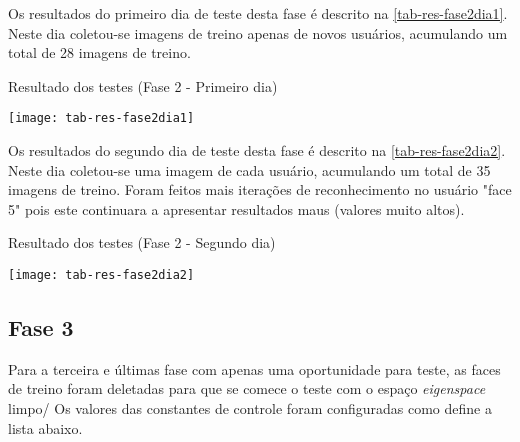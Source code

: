 Os resultados do primeiro dia de teste desta fase é descrito na \autoref{tab-res-fase2dia1}. Neste dia coletou-se imagens de treino apenas de novos usuários, acumulando um total de 28 imagens de treino. 


\begin{table}[h]
	\centering
	\caption{Resultado dos testes (Fase 2 - Primeiro dia) }
	\texttt{[image: tab-res-fase2dia1]}
	\label{tab-res-fase2dia1}
\end{table}


Os resultados do segundo dia de teste desta fase é descrito na \autoref{tab-res-fase2dia2}. Neste dia coletou-se uma imagem de cada usuário, acumulando um total de 35 imagens de treino. Foram feitos mais iterações de reconhecimento no usuário "face 5" pois este continuara a apresentar resultados maus (valores muito altos).


\begin{table}[h]
	\centering
	\caption{Resultado dos testes (Fase 2 - Segundo dia) }
	\texttt{[image: tab-res-fase2dia2]}
	\label{tab-res-fase2dia2}
\end{table}



\subsection{Fase 3}\label{ch:testresultfaz3}
Para a terceira e últimas fase com apenas uma oportunidade para teste, as faces de treino foram deletadas para que se comece o teste com o espaço \textit{eigenspace} limpo/ Os valores das constantes de controle foram configuradas como define a lista abaixo.

